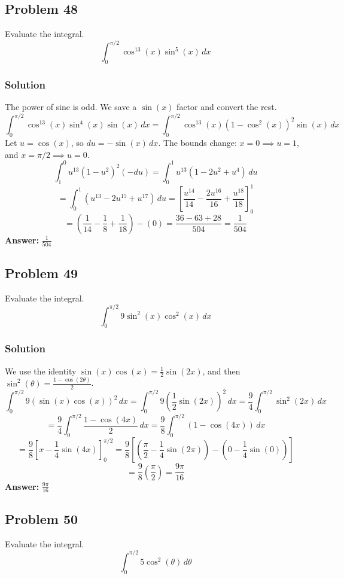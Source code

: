 \documentclass{article}
\begin{document}
\subsection{Problem 48}
Evaluate the integral.
$$ \int_{0}^{\pi/2} \cos^{13}(x) \sin^5(x) \,dx $$
\subsubsection*{Solution}
The power of sine is odd. We save a $\sin(x)$ factor and convert the rest.
$$ \int_{0}^{\pi/2} \cos^{13}(x) \sin^4(x) \sin(x) \,dx = \int_{0}^{\pi/2} \cos^{13}(x) (1-\cos^2(x))^2 \sin(x) \,dx $$
Let $u = \cos(x)$, so $du = -\sin(x) \,dx$. The bounds change: $x=0 \implies u=1$, and $x=\pi/2 \implies u=0$.
$$ \int_{1}^{0} u^{13} (1-u^2)^2 (-du) = \int_{0}^{1} u^{13} (1 - 2u^2 + u^4) \,du $$
$$ = \int_{0}^{1} (u^{13} - 2u^{15} + u^{17}) \,du = \left[ \frac{u^{14}}{14} - \frac{2u^{16}}{16} + \frac{u^{18}}{18} \right]_{0}^{1} $$
$$ = \left( \frac{1}{14} - \frac{1}{8} + \frac{1}{18} \right) - (0) = \frac{36 - 63 + 28}{504} = \frac{1}{504} $$
\textbf{Answer:} $ \frac{1}{504} $
\subsection{Problem 49}
Evaluate the integral.
$$ \int_{0}^{\pi/2} 9 \sin^2(x) \cos^2(x) \,dx $$
\subsubsection*{Solution}
We use the identity $\sin(x)\cos(x) = \frac{1}{2}\sin(2x)$, and then $\sin^2(\theta) = \frac{1 - \cos(2\theta)}{2}$.
$$ \int_{0}^{\pi/2} 9 (\sin(x) \cos(x))^2 \,dx = \int_{0}^{\pi/2} 9 \left(\frac{1}{2}\sin(2x)\right)^2 \,dx = \frac{9}{4} \int_{0}^{\pi/2} \sin^2(2x) \,dx $$
$$ = \frac{9}{4} \int_{0}^{\pi/2} \frac{1 - \cos(4x)}{2} \,dx = \frac{9}{8} \int_{0}^{\pi/2} (1 - \cos(4x)) \,dx $$
$$ = \frac{9}{8} \left[ x - \frac{1}{4}\sin(4x) \right]_{0}^{\pi/2} = \frac{9}{8} \left[ (\frac{\pi}{2} - \frac{1}{4}\sin(2\pi)) - (0 - \frac{1}{4}\sin(0)) \right] $$
$$ = \frac{9}{8} \left( \frac{\pi}{2} \right) = \frac{9\pi}{16} $$
\textbf{Answer:} $ \frac{9\pi}{16} $
\subsection{Problem 50}
Evaluate the integral.
$$ \int_{0}^{\pi/2} 5 \cos^2(\theta) \,d\theta $$
\end{document}
